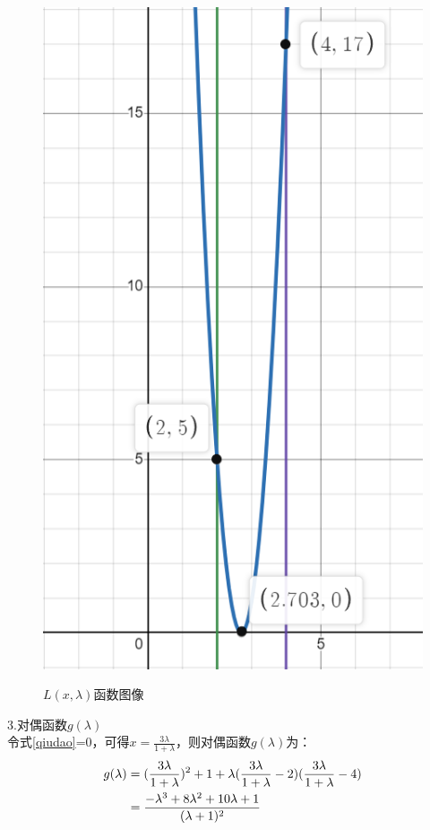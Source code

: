 \documentclass[12pt,a4paper]{ctexart}
\begin{document}
\begin{itemize}
\begin{figure}[!h]
{            \includegraphics[scale=0.5]{image/L(x,x_0).png}}
        \caption{$L(x,\lambda)$函数图像}
        \label{拉格朗日函数}
    \end{figure}
    3.对偶函数$g(\lambda)$\\
    令式\eqref{qiudao}=0，可得$x=\frac{3\lambda}{1+\lambda}$，则对偶函数$g(\lambda)$为：
    \begin{align}
        g(\lambda)&=(\frac{3\lambda}{1+\lambda})^2+1+\lambda(\frac{3\lambda}{1+\lambda}-2)(\frac{3\lambda}{1+\lambda}-4) \notag \\
                                &=\frac{-\lambda^3+8\lambda^2+10\lambda+1}{(\lambda+1)^2} \label{对偶函数g表达式}
    \end{align}

\end{itemize}
\end{document}
